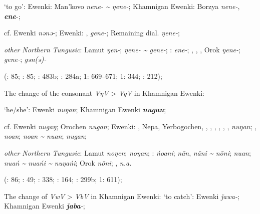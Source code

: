 \documentclass[output=paper,colorlinks,citecolor=brown]{langscibook}
\begin{document}
    \ex ‘to go’:  Ewenki: Man’kovo \textit{nene- {\textasciitilde} ŋene-}; Khamnigan Ewenki: Borzya \textit{nene-},  \textbf{\textit{ene}}{}-;

    cf.  Ewenki \textit{nǝnǝ-};  Ewenki: ,  \textit{gene-}; Remaining dial. \textit{ŋene-};

    \textit{other Northern Tungusic}: Lamut \textit{ŋen-};  \textit{ŋene- {\textasciitilde} gene-}; \textit{}:  \textit{ene-}; , , , Orok \textit{ŋene-};  \textit{gene-};  \textit{gǝn(ǝ)-}
    
    (\citealt{Castrén1856}: 85; \citealt{Janhunen1991}: 85; \citealt{Dorji1998}: 483b; \citealt{Vasilevic1958}: 284a; \citealt{Cincius1975B} 1: 669--671; \citealt{Hauer1952} 1: 344; \citealt{Zikmundová2013a}: 212);
\z
\z

\ea
The change of the consonant \textit{VŋV} > \textit{VgV} in Khamnigan Ewenki:


\ea ‘he/she’:  Ewenki \textit{nuŋan}; Khamnigan Ewenki \textbf{\textit{nugan}};

    cf.  Ewenki \textit{nugaŋ}; Orochen \textit{nugan};  Ewenki: , Nepa, Yerbogochen, , , , , , ,  \textit{nuŋan}; ,  \textit{noan};  \textit{noan {\textasciitilde} nuan};  \textit{nugan};

    \textit{other Northern Tungusic}: Lamut \textit{noŋen};  \textit{noŋan}; \textit{}:  \textit{ńoani};  \textit{nān}, \textit{nāni {\textasciitilde} nōni};  \textit{nuan};  \textit{nuań {\textasciitilde} nuańi {\textasciitilde} nuŋańi}; Orok \textit{nōni}; ,  \textit{n.a.}
    
    (\citealt{Castrén1856}: 86; \citealt{Janhunen1991}: 49; \citealt{Chaoke2014bB}: 338; \citealt{Chaoke2014a}: 164; \citealt{Vasilevic1958}: 299b; \citealt{Cincius1975B} 1: 611);
\z
\z

\pagebreak
\ea
The change of \textit{VwV} > \textit{VbV} in Khamnigan Ewenki:
\ea  ‘to catch’:  Ewenki \textit{ǰawa-}; Khamnigan Ewenki \textbf{\textit{ǰaba}}\textit{{}-};
\end{document}
